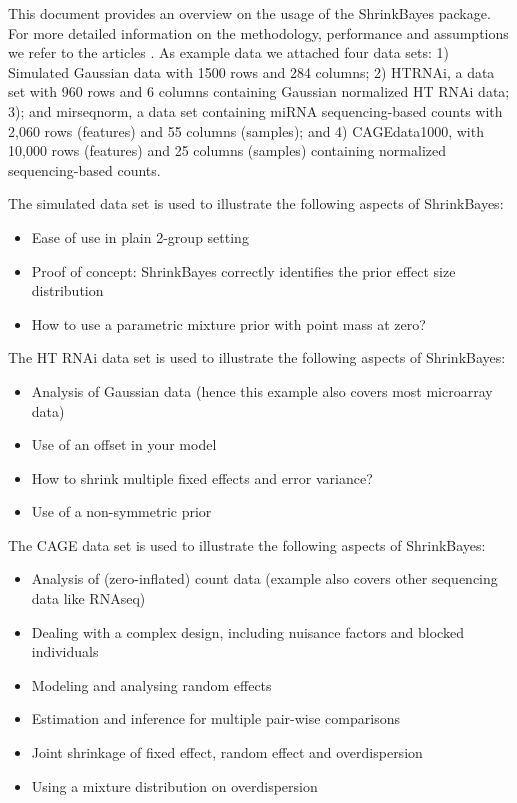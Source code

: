\documentclass[11pt]{article}
\newcommand{\para}{\bigskip\noindent}
\begin{document}
This document provides an overview on the usage of the ShrinkBayes package.
For more detailed information on the methodology, performance and assumptions we refer to the articles
\citep{WielShrinkSeq,WielHTRNAi,WielShrinkBayes}.
As example data we attached four data sets: 1) Simulated Gaussian data with 1500 rows and 284 columns; 2) HTRNAi, a data set with 960 rows and 6 columns containing Gaussian normalized HT RNAi
data; 3); and mirseqnorm, a data set containing miRNA sequencing-based counts with 2,060 rows (features) and 55 columns (samples); and
4) CAGEdata1000, with 10,000 rows (features) and 25 columns (samples) containing normalized sequencing-based counts.

\para
The simulated data set is used to illustrate the following aspects of ShrinkBayes:
\begin{itemize}
\item Ease of use in plain 2-group setting
\item Proof of concept: ShrinkBayes correctly identifies the prior effect size distribution
\item How to use a parametric mixture prior with point mass at zero?
\end{itemize}

\para
The HT RNAi data  set is used to illustrate the following aspects of ShrinkBayes:
\begin{itemize}
\item Analysis of Gaussian data (hence this example also covers most microarray data)
\item Use of an offset in your model
\item How to shrink multiple fixed effects and error variance?
\item Use of a non-symmetric prior
\end{itemize}

\para
The CAGE data set is used to illustrate the following aspects of ShrinkBayes:
\begin{itemize}
\item Analysis of (zero-inflated) count data (example also covers other sequencing data like RNAseq)
\item Dealing with a complex design, including nuisance factors and blocked individuals
\item Modeling and analysing random effects
\item Estimation and inference for multiple pair-wise comparisons
\item Joint shrinkage of fixed effect, random effect and overdispersion
\item Using a mixture distribution on overdispersion
\end{itemize}
\end{document}
